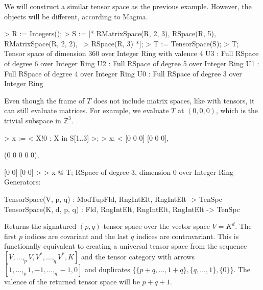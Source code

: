\begin{example}[UniversalTenSpc]

We will construct a similar tensor space as the previous example. 
However, the objects will be different, according to Magma.
\begin{code}
> R := Integers();
> S := [* RMatrixSpace(R, 2, 3), RSpace(R, 5), RMatrixSpace(R, 2, 2), \
>     RSpace(R, 3) *];
> T := TensorSpace(S);
> T;
Tensor space of dimension 360 over Integer Ring with valence 4
U3 : Full RSpace of degree 6 over Integer Ring
U2 : Full RSpace of degree 5 over Integer Ring
U1 : Full RSpace of degree 4 over Integer Ring
U0 : Full RSpace of degree 3 over Integer Ring
\end{code}

Even though the frame of $T$ does not include matrix spaces, like with tensors,
it can still evaluate matrices. For example, we evaluate $T$ at $(0,0,0)$, which
is the trivial subspace in $\mathbb{Z}^3$.
\begin{code}
> x := < X!0 : X in S[1..3] >;
> x;
<
    [0 0 0]
    [0 0 0],

    (0 0 0 0 0),

    [0 0]
    [0 0]
>
> x @ T;
RSpace of degree 3, dimension 0 over Integer Ring
Generators: 

\end{code}
\end{example}

\begin{intrinsics}
TensorSpace(V, p, q) : ModTupFld, RngIntElt, RngIntElt -> TenSpc
TensorSpace(K, d, p, q) : Fld, RngIntElt, RngIntElt, RngIntElt -> TenSpc
\end{intrinsics}

Returns the signatured $(p,q)$-tensor space over the vector space $V=K^d$. The
first $p$ indices are covariant and the last $q$ indices are contravariant. This
is functionally equivalent to creating a universal tensor space from the
sequence $[V,\dots,_p V, V^*,\dots,_q V^*, K]$ and the tensor category with
arrows $[1,\dots,_p 1, -1,\dots,_q -1, 0]$ and duplicates
$\{\{p+q,\dots,1+q\},\{q,\dots,1\},\{0\}\}$. The valence of the returned tensor
space will be $p+q+1$. 

